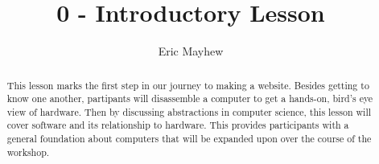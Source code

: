 \documentclass[12pt]{article}
\title{0 - Introductory Lesson}
\author{Eric Mayhew}
\date{}
\begin{document}
\renewcommand{\abstractname}{\vspace{-\baselineskip}}
\maketitle
\begin{abstract}
This lesson marks the first step in our journey to making a website. Besides
  getting to know one another,
  partipants will disassemble a computer to get a hands-on, bird's eye view of
  hardware. Then by discussing abstractions in computer science, this lesson
  will cover software
  and its relationship to hardware. This provides participants with a general
  foundation about computers that will be expanded upon over the course
  of the workshop.
\end{abstract}
\end{document}
